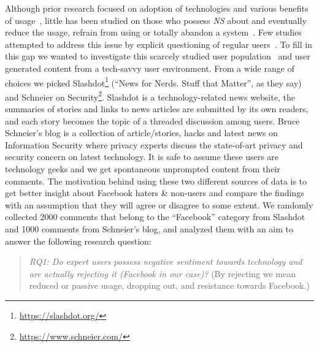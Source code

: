 Although prior research focused on adoption of technologies and various benefits of usage~\cite{joinson2008looking}, little has been studied on those who possess \emph{NS} about and eventually reduce the usage, refrain from using or totally abandon a system~\cite{wyatt2003non}. Few studies attempted to address this issue by explicit questioning of regular users~\cite{baumer2013limiting, nonnecke2001lurkers}. To fill in this gap we wanted to investigate this scarcely studied user population~\cite{baumer2014refusing} and user generated content from a tech-savvy user environment. From a wide range of choices we picked Slashdot\footnote{\url{https://slashdot.org/}} (``News for Nerds. Stuff that Matter'', as they say) and Schneier on Security\footnote{\url{https://www.schneier.com/}}. Slashdot is a technology-related news website, the summaries of stories and links to news articles are submitted by its own readers, and each story becomes the topic of a threaded discussion among users. Bruce Schneier's blog is a collection of article/stories, hacks and latest news on Information Security where privacy experts discuss the state-of-art privacy and security concern on latest technology. It is safe to assume these users are technology geeks and we get spontaneous unprompted content from their comments. The motivation behind using these two different sources of data is to get better insight about Facebook haters \& non-users and compare the findings with an assumption that they will agree or disagree to some extent. We randomly collected 2000 comments that belong to the ``Facebook'' category from Slashdot and 1000 comments from Schneier's blog, and analyzed them with an aim to answer the following research question:


\begin{quote}
    \textit{RQ1: Do expert users possess negative sentiment towards technology and are actually rejecting it (Facebook in our case)?} (By rejecting we mean reduced or passive usage, dropping out, and resistance towards Facebook.)

\end{quote}

